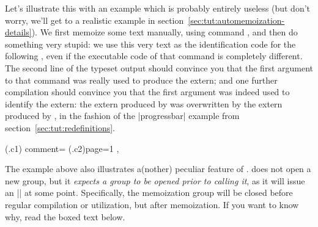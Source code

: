 \documentclass[a4paper,11pt]{article}
\begin{document}
Let's illustrate this with an example which is probably entirely useless (but
don't worry, we'll get to a realistic example in
section~\ref{sec:tut:automemoization-details}).  We first memoize some text
manually, using command , and then do something very stupid: we use
this very text as the identification code for the following ,
even if the executable code of that command is completely different.  The
second line of the typeset output should convince you that the first argument
to that command was really used to produce the extern; and one further
compilation should convince you that the first argument was indeed used to
identify the extern: the extern produced by  was overwritten by the
extern produced by , in the fashion of the |progressbar|
example from section~\ref{sec:tut:redefinitions}.

(.c1){
  comment={%
    \hfill
    (.c2){page=1}
  },
}

The example above also illustrates a(nother) peculiar feature of
.   does not open a new  group, but
it \emph{expects a group to be opened prior to calling it}, as it will issue an
|\endgroup| at some point.  Specifically, the memoization group will be closed
before regular compilation or utilization, but after memoization.  If you want
to know why, read the boxed text below.
\end{document}
